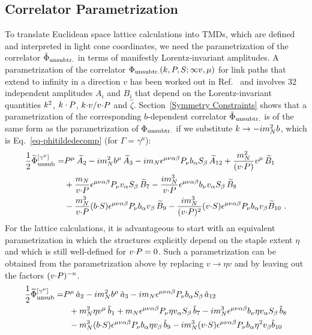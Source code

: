 \subsection{Correlator Parametrization}
\label{sec-parametr}
To translate Euclidean space lattice calculations into TMDs, which are defined and interpreted in light cone coordinates, we need the parametrization of the correlator $\tilde \Phi_{\text{unsubtr.}}$ in terms of manifestly Lorentz-invariant amplitudes. A parametrization of the correlator 
$\Phi_{\text{unsubtr.}}(k,P,S;\infty v,\mu)$
for link paths that extend to infinity in a direction $v$
has been worked out in Ref.~\cite{Goeke:2005hb} and involves 32 independent amplitudes $A_i$ and $B_i$ that depend on the Lorentz-invariant quantities 
$k^2$, $k \cdot P$, $k {\cdot} v/v {\cdot} P$ and $\hat \zeta$.
Section~\ref{Symmetry Constraints} shows that a parametrization of the corresponding $b$-dependent correlator $\tilde \Phi_{\text{unsubtr.}}$ is of the same form as the parametrization of $\Phi_{\text{unsubtr.}}$ if we substitute $k \rightarrow - i m_N^2 b$, which is Eq.~\eqref{eq-phitildedecomp} (for $\Gamma = \gamma^\mu$):
\begin{align}  
\frac{1}{2}\widetilde \Phi^{[\gamma^\mu]}_{\text{unsub}}  = & P^\mu\, \widetilde{A}_2 - i m_N^2 b^\mu\, \widetilde{A}_3 - i m_N \epsilon^{\mu \nu \alpha \beta} P_\nu b_\alpha S_\beta\, \widetilde{A}_{12} + \frac{m_N^2}{(v {\cdot} P)} v^\mu\, \widetilde{B}_1\nonumber\\
& + \frac{m_N}{v {\cdot} P} \epsilon^{\mu \nu \alpha \beta} P_\nu v_\alpha S_\beta\, \widetilde{B}_7  - \frac{ i m_N^3}{v {\cdot} P} \epsilon^{\mu \nu \alpha \beta} b_\nu v_\alpha S_\beta\, \widetilde{B}_8 \nonumber\\
& - \frac{m_N^3}{v {\cdot} P} (b {\cdot} S) \epsilon^{\mu \nu \alpha \beta} P_\nu b_\alpha v_\beta\, \widetilde{B}_9  - \frac{i m_N^3}{(v {\cdot} P)^2} (v {\cdot} S) \epsilon^{\mu \nu \alpha \beta} P_\nu b_\alpha v_\beta \widetilde{B}_{10}\ . 
\label{eq-phitildedecomp-again}
\end{align}
For the lattice calculations, it is advantageous to start with an equivalent parametrization in which the structures explicitly depend on the staple extent $\eta$ and which is still well-defined for $v {\cdot} P = 0$. Such a parametrization can be obtained from the parametrization above by replacing $v \rightarrow \eta v$ and by leaving out the factors $(v {\cdot} P)^{-n}$.
\begin{align}  
\frac{1}{2}\widetilde \Phi^{[\gamma^\mu]}_{\text{unsub}}  = & P^\mu\, \tilde a_2 - i m_N^2 b^\mu\, \tilde a_3
		- i m_N \epsilon^{\mu \nu \alpha \beta} P_\nu b_\alpha S_\beta\, \tilde a_{12} \nonumber \\ &
		~~+ m_N^2 \eta v^\mu\, \tilde b_1 
		+ m_N \epsilon^{\mu \nu \alpha \beta} P_\nu \eta v_\alpha S_\beta\, \tilde b_7  
		-  i m_N^3 \epsilon^{\mu \nu \alpha \beta} b_\nu \eta v_\alpha S_\beta\, \tilde b_8 \nonumber \\ &
		~~- m_N^3 (b {\cdot} S) \epsilon^{\mu \nu \alpha \beta} P_\nu b_\alpha \eta v_\beta\, \tilde b_9
		-i m_N^3 (v {\cdot} S) \epsilon^{\mu \nu \alpha \beta} P_\nu b_\alpha \eta^2 v_\beta \tilde b_{10}
\label{eq-phitildedecomp-lowere}
\end{align}
